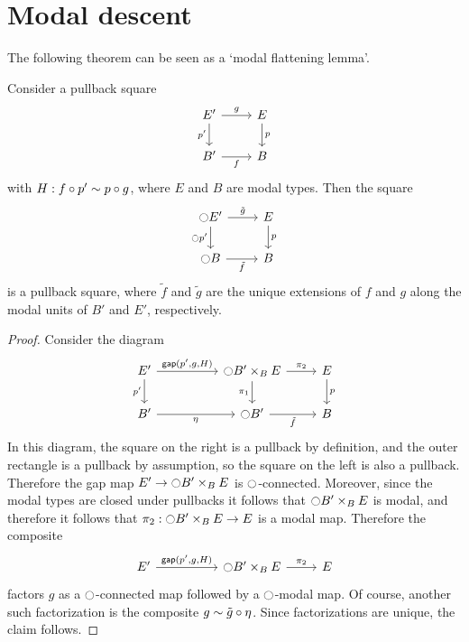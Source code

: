 \documentclass[9pt,twosided]{amsart}
\begin{document}
\section{Modal descent}

The following theorem can be seen as a `modal flattening lemma'.
\begin{thm}\label{thm:etale_flattening}
Consider a pullback square
\begin{equation*}
\begin{tikzcd}
E' \arrow[d,swap,"{p'}"] \arrow[r,"g"] & E \arrow[d,"p"] \\
B' \arrow[r,swap,"f"] & B
\end{tikzcd}
\end{equation*}
with $H:f\circ p'\sim p\circ g$, where $E$ and $B$ are modal types. Then the square
\begin{equation*}
\begin{tikzcd}
\modal E' \arrow[r,"\tilde{g}"] \arrow[d,swap,"{\modal p'}"] & E \arrow[d,"p"] \\
\modal B \arrow[r,swap,"\tilde{f}"] & B
\end{tikzcd}
\end{equation*}
is a pullback square, where $\tilde{f}$ and $\tilde{g}$ are the unique extensions of $f$ and $g$ along the modal units of $B'$ and $E'$, respectively.
\end{thm}

\begin{proof}
Consider the diagram
\begin{equation*}
\begin{tikzcd}
E' \arrow[r,"{\mathsf{gap}(p',g,H)}"] \arrow[d,swap,"{p'}"] &[2.5em] \modal B'\times_{B} E \arrow[r,"\pi_2"] \arrow[d,swap,"\pi_1"] & E \arrow[d,"p"] \\
B' \arrow[r,swap,"\modalunit"] & \modal B' \arrow[r,swap,"\tilde{f}"] & B
\end{tikzcd}
\end{equation*}
In this diagram, the square on the right is a pullback by definition, and the outer rectangle is a pullback by assumption, so the square on the left is also a pullback. Therefore the gap map $E'\to {\ensuremath{\ocircle}} B'\times_B E$ is ${\ocircle}$-connected. Moreover, since the modal types are closed under pullbacks it follows that ${\ocircle} B'\times_B E$ is modal, and therefore it follows that $\pi_2:{\ocircle} B'\times_B E\to E$ is a modal map. Therefore the composite
\begin{equation*}
\begin{tikzcd}
E' \arrow[r,"{\mathsf{gap}(p',g,H)}"] &[2.5em] \modal B'\times_{B} E \arrow[r,"\pi_2"] & E 
\end{tikzcd}
\end{equation*}
factors $g$ as a ${\ocircle}$-connected map followed by a ${\ocircle}$-modal map. Of course, another such factorization is the composite $g\sim \tilde{g}\circ{\eta_{}}$. Since factorizations are unique, the claim follows.
\end{proof}
\end{document}
